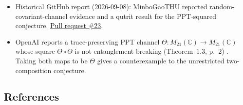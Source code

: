 \begin{itemize}
  \item Historical GitHub report (2026-09-08): MinboGaoTHU reported random-covariant-channel evidence and a qutrit result for the PPT-squared conjecture. \href{https://github.com/Naixu-Guo/quantum-open-problems/pull/23}{Pull request \#23}.

  \item OpenAI reports a trace-preserving PPT channel
  $\Theta:M_{21}(\mathbb C)\to M_{21}(\mathbb C)$ whose square
  $\Theta\circ\Theta$ is not entanglement breaking
  (Theorem~1.3, p.~2) .
  Taking both maps to be $\Theta$ gives a counterexample to the
  unrestricted two-composition conjecture.
\end{itemize}

\subsection*{References}

